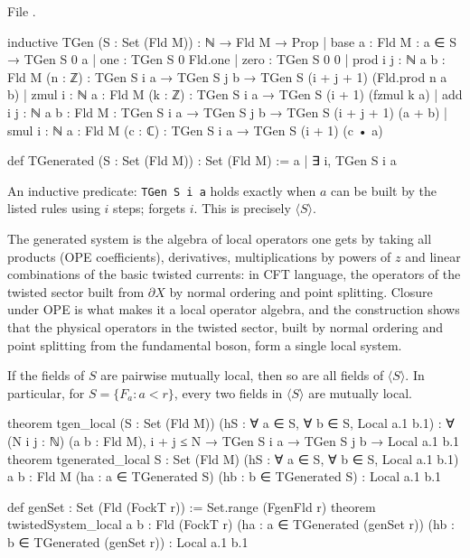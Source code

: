 \noindent File .
\begin{leancode}
inductive TGen (S : Set (Fld M)) : ℕ → Fld M → Prop
  | base {a : Fld M} : a ∈ S → TGen S 0 a
  | one : TGen S 0 Fld.one
  | zero : TGen S 0 0
  | prod {i j : ℕ} {a b : Fld M} (n : ℤ) : TGen S i a → TGen S j b →
      TGen S (i + j + 1) (Fld.prod n a b)
  | zmul {i : ℕ} {a : Fld M} (k : ℤ) : TGen S i a → TGen S (i + 1) (fzmul k a)
  | add {i j : ℕ} {a b : Fld M} : TGen S i a → TGen S j b → TGen S (i + j + 1) (a + b)
  | smul {i : ℕ} {a : Fld M} (c : ℂ) : TGen S i a → TGen S (i + 1) (c • a)

def TGenerated (S : Set (Fld M)) : Set (Fld M) := {a | ∃ i, TGen S i a}
\end{leancode}

\begin{dictionary}
An inductive predicate: \verb|TGen S i a| holds exactly when $a$ can be built by the listed
rules using $i$ steps;  forgets $i$. This is precisely $\langle S\rangle$.
\end{dictionary}

\begin{physics}
The generated system is the algebra of local operators one gets by taking all products (OPE coefficients), derivatives, multiplications by powers of $z$ and linear combinations of the basic twisted currents: in CFT language, the operators of the twisted sector built from $\partial X$ by normal ordering and point splitting. Closure under OPE is what makes it a local operator algebra, and the construction shows that the physical operators in the twisted sector, built by normal ordering and point splitting from the fundamental boson, form a single local system.
\end{physics}

\begin{theorem}\label{ch07:thm:tgenlocal}
If the fields of $S$ are pairwise mutually local, then so are all fields of $\langle S\rangle$.
In particular, for $S = \{F_a : a<r\}$, every two fields in $\langle S\rangle$ are mutually local.
\end{theorem}

\begin{leancode}
theorem tgen_local (S : Set (Fld M)) (hS : ∀ a ∈ S, ∀ b ∈ S, Local a.1 b.1) :
    ∀ (N i j : ℕ) (a b : Fld M), i + j ≤ N → TGen S i a → TGen S j b → Local a.1 b.1
theorem tgenerated_local {S : Set (Fld M)} (hS : ∀ a ∈ S, ∀ b ∈ S, Local a.1 b.1)
    {a b : Fld M} (ha : a ∈ TGenerated S) (hb : b ∈ TGenerated S) : Local a.1 b.1

def genSet : Set (Fld (FockT r)) := Set.range (FgenFld r)
theorem twistedSystem_local {a b : Fld (FockT r)} (ha : a ∈ TGenerated (genSet r))
    (hb : b ∈ TGenerated (genSet r)) : Local a.1 b.1
\end{leancode}

